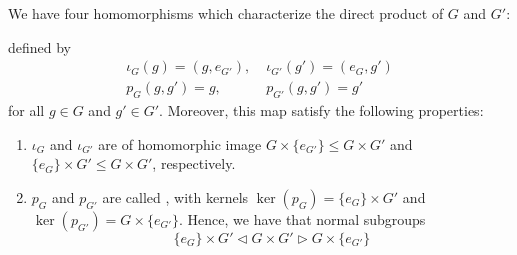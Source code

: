 \documentclass[12pt, a4paper, twoside, openright, titlepage]{book}
\begin{document}
\begin{rmk}{}{}
        We have four homomorphisms which characterize the direct product of $G$ and $G'$:
        \begin{center}
        \end{center}
        defined by \begin{align}
                \iota_G(g) = (g,e_{G'}),&\;\iota_{G'}(g') = (e_G,g') \\
                p_G(g,g') = g,&\;p_{G'}(g,g') = g'
        \end{align}
        for all $g \in G$ and $g' \in G'$. Moreover, this map satisfy the following properties: \begin{enumerate}
                \item $\iota_G$ and $\iota_{G'}$ are  of homomorphic image $G \times \{e_{G'}\} \leq G\times G'$ and $\{e_G\}\times G' \leq G\times G'$, respectively.
                \item $p_G$ and $p_{G'}$ are  called , with kernels $\ker(p_G) = \{e_G\}\times G'$ and $\ker(p_{G'}) = G\times \{e_{G'}\}$. Hence, we have that normal subgroups \begin{equation}
                                \{e_G\}\times G' \vartriangleleft G \times G' \vartriangleright G\times \{e_{G'}\}
                \end{equation}
        \end{enumerate}
\end{rmk}
\end{document}
